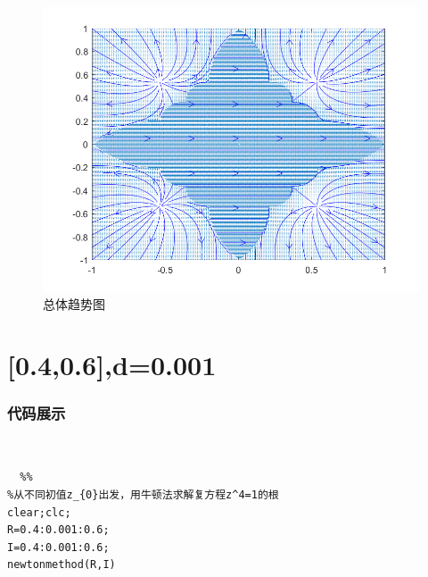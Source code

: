\documentclass[UTF8,a4paper,10pt]{ctexart}
\begin{document}
 \newline
	\begin{figure}[!htbp]
		\centering
		\includegraphics[width=1\textwidth,height=1\textwidth]{pictures/1_3.png}
		\caption{总体趋势图} \label{1_3}
	\end{figure}

\section{[0.4,0.6]\times [0.4,0.6],d=0.001}
\subsubsection{代码展示}
~\\
\lstset{language=matlab}
\begin{lstlisting}
  %%
%从不同初值z_{0}出发，用牛顿法求解复方程z^4=1的根
clear;clc;
R=0.4:0.001:0.6;
I=0.4:0.001:0.6;
newtonmethod(R,I)
\end{lstlisting}
\end{document}
